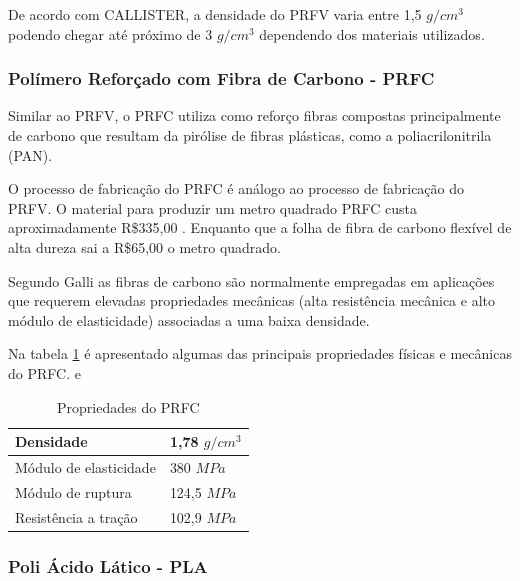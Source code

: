     \par De acordo com CALLISTER, a densidade do PRFV varia entre 1,5 $g/cm^3$ podendo chegar até próximo de 3 $g/cm^3$ dependendo dos materiais utilizados. \cite{callister2000ciencia}
    
    \subsubsection{Polímero Reforçado com Fibra de Carbono - PRFC}
    
    \par Similar ao PRFV, o PRFC utiliza como reforço fibras compostas principalmente de carbono que resultam da pirólise de fibras plásticas, como a poliacrilonitrila (PAN). 
    
    \par O processo de fabricação do PRFC é análogo ao processo de fabricação do PRFV. O material para produzir um metro quadrado PRFC custa aproximadamente R\$335,00 \cite{fc_kit}. Enquanto que a folha de fibra de carbono flexível de alta dureza sai a R\$65,00 o metro quadrado. \cite{fc_placa}
    
    \par Segundo Galli as fibras de carbono são normalmente empregadas em aplicações que requerem elevadas propriedades mecânicas (alta resistência mecânica e alto módulo de elasticidade) associadas a uma baixa densidade. \cite{galli2016caracterizaccao}
    
    \par Na tabela \ref{tab:PRFC} é apresentado algumas das principais propriedades físicas e mecânicas do PRFC. \cite{HOLOS5320} e \cite{vanicomparaccao}
    
    \begin{table}[h]
\centering
\begin{tabular}{|l|l|}
\hline
Densidade              & 1,78 $g/cm^3$ \\ \hline
Módulo de elasticidade & 380 $MPa$ \\ \hline
Módulo de ruptura      & 124,5 $MPa$ \\ \hline
Resistência a tração   & 102,9 $MPa$ \\ \hline
\end{tabular}
\caption{Propriedades do PRFC}
\label{tab:PRFC}
\end{table}
    
\subsubsection{Poli Ácido Lático - PLA}
    
